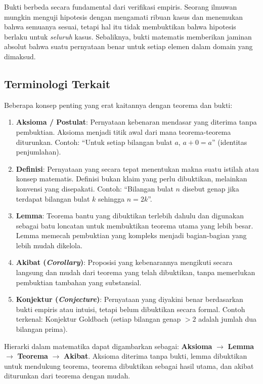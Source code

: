 Bukti berbeda secara fundamental dari verifikasi empiris. Seorang ilmuwan mungkin menguji hipotesis dengan mengamati ribuan kasus dan menemukan bahwa semuanya sesuai, tetapi hal itu tidak membuktikan bahwa hipotesis berlaku untuk \emph{seluruh} kasus. Sebaliknya, bukti matematis memberikan jaminan absolut bahwa suatu pernyataan benar untuk setiap elemen dalam domain yang dimaksud.

\subsection{Terminologi Terkait}

Beberapa konsep penting yang erat kaitannya dengan teorema dan bukti:

\begin{enumerate}[label=\textbf{\arabic*.}]
  \item \textbf{Aksioma / Postulat}: Pernyataan kebenaran mendasar yang diterima tanpa pembuktian. Aksioma menjadi titik awal dari mana teorema-teorema diturunkan. Contoh: ``Untuk setiap bilangan bulat $a$, $a + 0 = a$'' (identitas penjumlahan).

  \item \textbf{Definisi}: Pernyataan yang secara tepat menentukan makna suatu istilah atau konsep matematis. Definisi bukan klaim yang perlu dibuktikan, melainkan konvensi yang disepakati. Contoh: ``Bilangan bulat $n$ disebut genap jika terdapat bilangan bulat $k$ sehingga $n = 2k$''.

  \item \textbf{Lemma}: Teorema bantu yang dibuktikan terlebih dahulu dan digunakan sebagai batu loncatan untuk membuktikan teorema utama yang lebih besar. Lemma memecah pembuktian yang kompleks menjadi bagian-bagian yang lebih mudah dikelola.

  \item \textbf{Akibat (\textit{Corollary})}: Proposisi yang kebenarannya mengikuti secara langsung dan mudah dari teorema yang telah dibuktikan, tanpa memerlukan pembuktian tambahan yang substansial.

  \item \textbf{Konjektur (\textit{Conjecture})}: Pernyataan yang diyakini benar berdasarkan bukti empiris atau intuisi, tetapi belum dibuktikan secara formal. Contoh terkenal: Konjektur Goldbach (setiap bilangan genap $> 2$ adalah jumlah dua bilangan prima).
\end{enumerate}

\begin{konsep}
Hierarki dalam matematika dapat digambarkan sebagai: \textbf{Aksioma} $\rightarrow$ \textbf{Lemma} $\rightarrow$ \textbf{Teorema} $\rightarrow$ \textbf{Akibat}. Aksioma diterima tanpa bukti, lemma dibuktikan untuk mendukung teorema, teorema dibuktikan sebagai hasil utama, dan akibat diturunkan dari teorema dengan mudah.
\end{konsep}

